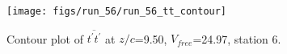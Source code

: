 \begin{figure}[H]
\centering
\texttt{[image: figs/run\_56/run\_56\_tt\_contour]}
\caption{Contour plot of $\overline{t^\prime t^\prime}$ at $z/c$=9.50, $V_{free}$=24.97, station 6.}
\label{fig:run_56_tt_contour}
\end{figure}


